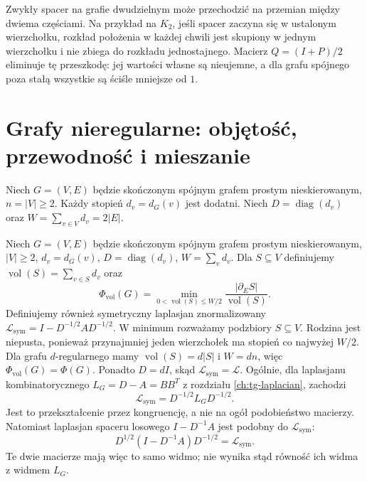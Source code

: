 \begin{uwaga}
\label{rem:tg-expander-lazy-needed}
Zwykły spacer na grafie
dwudzielnym może przechodzić
na przemian między dwiema
częściami. Na przykład
na $K_2$, jeśli spacer zaczyna się w ustalonym
wierzchołku, rozkład położenia w każdej chwili
jest skupiony w jednym wierzchołku
i nie zbiega do
rozkładu jednostajnego.
Macierz $Q=(I+P)/2$
eliminuje tę przeszkodę:
jej wartości własne
są nieujemne,
a dla grafu spójnego
poza stałą wszystkie
są ściśle mniejsze od $1$.
\end{uwaga}

\section{Grafy nieregularne: objętość, przewodność i mieszanie}
\label{sec:tg-expander-irregular}

Niech $G=(V,E)$ będzie skończonym spójnym grafem
prostym nieskierowanym, $n=|V|\geq2$.
Każdy stopień $d_v=d_G(v)$ jest dodatni.
Niech $D=\operatorname{diag}(d_v)$ oraz
$W=\sum_{v\in V}d_v=2|E|$.

\begin{definicja}
\label{def:tg-expander-volume}
Niech $G=(V,E)$ będzie skończonym spójnym grafem
prostym nieskierowanym, $|V|\geq2$, $d_v=d_G(v)$,
$D=\operatorname{diag}(d_v)$, $W=\sum_v d_v$.
Dla $S\subseteq V$ definiujemy
$\operatorname{vol}(S)=\sum_{v\in S}d_v$ oraz
\[
\Phi_{\mathrm{vol}}(G)=
\min_{0<\operatorname{vol}(S)\leq W/2}
\frac{|\partial_E S|}{\operatorname{vol}(S)}.
\]
Definiujemy również symetryczny laplasjan
znormalizowany $\mathcal L_{\mathrm{sym}}=
I-D^{-1/2}AD^{-1/2}$.
W minimum rozważamy podzbiory $S\subseteq V$.
Rodzina jest niepusta, ponieważ przynajmniej jeden
wierzchołek ma stopień co najwyżej $W/2$.
Dla grafu $d$-regularnego mamy $\operatorname{vol}(S)=d|S|$
i $W=dn$, więc $\Phi_{\mathrm{vol}}(G)=\Phi(G)$.
Ponadto $D=dI$, skąd $\mathcal L_{\mathrm{sym}}=\mathcal L$.
Ogólnie, dla laplasjanu kombinatorycznego $L_G=D-A=BB^T$
z rozdziału \ref{ch:tg-laplacian}, zachodzi
\[
\mathcal L_{\mathrm{sym}}=D^{-1/2}L_GD^{-1/2}.
\]
Jest to przekształcenie przez kongruencję, a nie na ogół
podobieństwo macierzy. Natomiast laplasjan spaceru losowego
$I-D^{-1}A$ jest podobny do $\mathcal L_{\mathrm{sym}}$:
\[
D^{1/2}(I-D^{-1}A)D^{-1/2}=\mathcal L_{\mathrm{sym}}.
\]
Te dwie macierze mają więc to samo widmo; nie wynika
stąd równość ich widma z widmem $L_G$.
\end{definicja}

